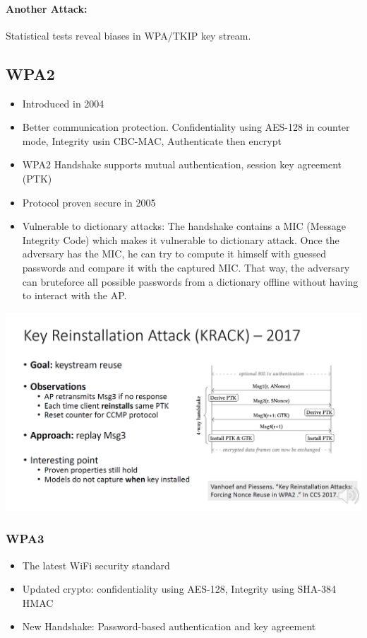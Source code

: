 \paragraph{Another Attack:} Statistical tests reveal biases in WPA/TKIP key stream.

\subsection{WPA2}
\begin{itemize}
    \item Introduced in 2004
    \item Better communication protection. Confidentiality using AES-128 in counter mode, Integrity usin CBC-MAC, Authenticate then encrypt
    \item WPA2 Handshake supports mutual authentication, session key agreement (PTK)
    \item Protocol proven secure in 2005
    \item Vulnerable to dictionary attacks: The handshake contains a MIC (Message Integrity Code) which makes it vulnerable to dictionary attack.
    Once the adversary has the MIC, he can try to compute it himself with guessed passwords and compare it with the captured MIC. That way, the adversary can bruteforce all possible passwords from a dictionary offline without having to interact with the AP.
\end{itemize}

\begin{minipage}{\linewidth}
    \centering      
    \includegraphics[width=\linewidth]{Figures/L9_krack.PNG}
\end{minipage}

\subsubsection{WPA3}
\begin{itemize}
    \item The latest WiFi security standard
    \item Updated crypto: confidentiality using AES-128, Integrity using SHA-384 HMAC
    \item New Handshake: Password-based authentication and key agreement
\end{itemize}

